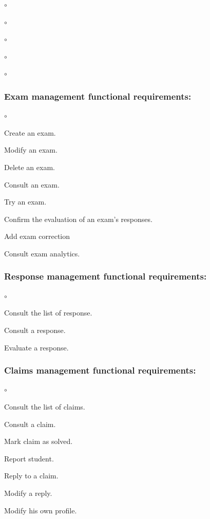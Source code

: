 \documentclass[]{uc2pfecaneva}
\begin{document}
\begin{list}{$\circ$}{}
\begin{list}{$\circ$}{}
\begin{list}{$\circ$}{}
\begin{list}{$\circ$}{}
\begin{list}{$\circ$}{}
        \subsubsection{Exam management functional requirements:}
        \begin{list}{$\circ$}{}
            \item Create an exam.
            \item Modify an exam.
            \item Delete an exam.
            \item Consult an exam.
            \item Try an exam.
            \item Confirm the evaluation of an exam's responses.
            \item Add exam correction
            \item Consult exam analytics.
        \end{list}

        \subsubsection{Response management functional requirements:}
        \begin{list}{$\circ$}{}
            \item Consult the list of response.
            \item Consult a response.
            \item Evaluate a response.
        \end{list}

        \subsubsection{Claims management functional requirements:}
        \begin{list}{$\circ$}{}
            \item Consult the list of claims.
            \item Consult a claim.
            \item Mark claim as solved.
            \item Report student.
            \item Reply to a claim.
            \item Modify a reply.
        \end{list}

        \item Modify his own profile.
    \end{list}



\end{list}
\end{list}
\end{list}
\end{list}
\end{document}

